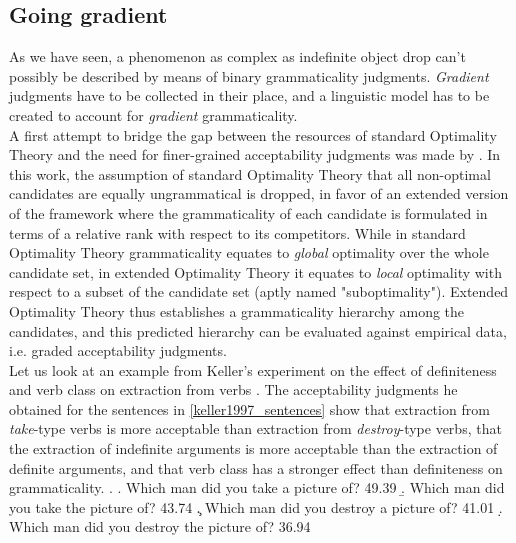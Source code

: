 \subsection{Going gradient}  %
As we have seen, a phenomenon as complex as indefinite object drop can't possibly be described by means of binary grammaticality judgments. \textit{Gradient} judgments have to be collected in their place, and a linguistic model has to be created to account for \textit{gradient} grammaticality.\\
A first attempt to bridge the gap between the resources of standard Optimality Theory and the need for finer-grained acceptability judgments was made by \textcite{keller1997extraction}. In this work, the assumption of standard Optimality Theory that all non-optimal candidates are equally ungrammatical is dropped, in favor of an extended version of the framework where the grammaticality of each candidate is formulated in terms of a relative rank with respect to its competitors. While in standard Optimality Theory grammaticality equates to \textit{global} optimality over the whole candidate set, in extended Optimality Theory it equates to \textit{local} optimality with respect to a subset of the candidate set (aptly named "suboptimality"). Extended Optimality Theory thus establishes a grammaticality hierarchy among the candidates, and this predicted hierarchy can be evaluated against empirical data, i.e. graded acceptability judgments.\\
Let us look at an example from Keller's experiment on the effect of definiteness and verb class on extraction from verbs \textcite[10-12]{keller1997extraction}. The acceptability judgments he obtained for the sentences in \ref{keller1997_sentences} show that extraction from \textit{take}-type verbs is more acceptable than extraction from \textit{destroy}-type verbs, that the extraction of indefinite arguments is more acceptable than the extraction of definite arguments, and that verb class has a stronger effect than definiteness on grammaticality.
\ex. \label{keller1997_sentences} \a. Which man did you take a picture of? \hfill 49.39
\b. Which man did you take the picture of? \hfill 43.74
\c. Which man did you destroy a picture of? \hfill 41.01
\d. Which man did you destroy the picture of? \hfill 36.94

